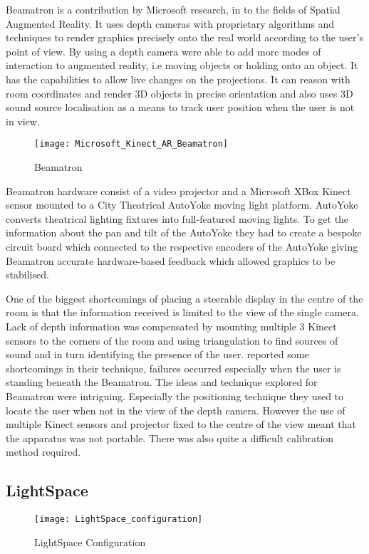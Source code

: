 Beamatron \cite{beamatron} is a contribution by Microsoft research,
in to the fields of Spatial Augmented Reality. It uses depth cameras
with proprietary algorithms and techniques to render graphics precisely
onto the real world according to the user's point of view. By using a
depth camera \citeauthor{beamatron} were able to add more modes of interaction to augmented
reality, i.e moving objects or holding onto an object. It has the capabilities
to allow live changes on the projections. It can reason with room
coordinates and render 3D objects in precise orientation and also uses 3D
sound source localisation as a means to track user position when the
user is not in view. 
\begin{figure}
\centering
\texttt{[image: Microsoft\_Kinect\_AR\_Beamatron]}
\protect\caption{Beamatron}
\end{figure}
Beamatron hardware consist of a video projector and a Microsoft XBox
Kinect sensor mounted to a City Theatrical AutoYoke\cite{autoyoke}
moving light platform. AutoYoke converts theatrical lighting fixtures into full-featured moving lights\cite{autoyoke}. To get the information about the pan and tilt
of the AutoYoke they had to create a bespoke circuit board which connected
to the respective encoders of the AutoYoke giving Beamatron accurate
hardware-based feedback which allowed graphics to be stabilised. 

One of the biggest shortcomings of placing a steerable display in
the centre of the room is that the information received is limited
to the view of the single camera. Lack of depth information was compensated by mounting multiple 3 Kinect sensors to the corners of the room and using triangulation to find sources of sound and in
turn identifying the presence of the user. \citeauthor{beamatron} reported some shortcomings
in their technique, failures occurred especially when the user is standing beneath the
Beamatron.
The ideas and technique explored for Beamatron were intriguing. Especially
the positioning technique they used to locate the user when not in
the view of the depth camera. However the use of multiple Kinect sensors
and projector fixed to the centre of the view meant that the apparatus
was not portable. There was also quite a difficult calibration method
required.


\subsection{LightSpace}
\begin{figure}[H]
\centering
\texttt{[image: LightSpace\_configuration]}
\protect\caption{LightSpace Configuration}
\label{lightspace-config}
\end{figure}

